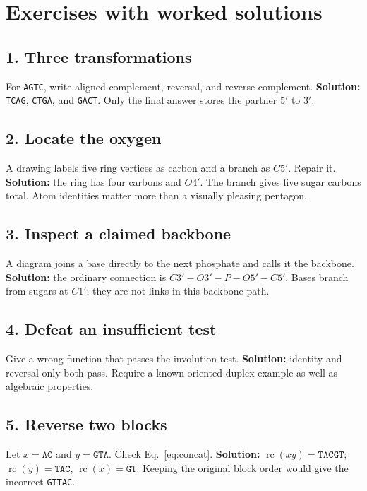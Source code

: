 \section{Exercises with worked solutions}

\subsection*{1. Three transformations}
For \texttt{AGTC}, write aligned complement, reversal, and reverse complement.
\textbf{Solution:} \texttt{TCAG}, \texttt{CTGA}, and \texttt{GACT}.
Only the final answer stores the partner $5'$ to $3'$.

\subsection*{2. Locate the oxygen}
A drawing labels five ring vertices as carbon and a branch as $C5'$.
Repair it. \textbf{Solution:} the ring has four carbons and $O4'$.
The branch gives five sugar carbons total. Atom identities matter more than
a visually pleasing pentagon.

\subsection*{3. Inspect a claimed backbone}
A diagram joins a base directly to the next phosphate and calls it the
backbone. \textbf{Solution:} the ordinary connection is
$C3'-O3'-P-O5'-C5'$. Bases branch from sugars at $C1'$; they are not
links in this backbone path.

\subsection*{4. Defeat an insufficient test}
Give a wrong function that passes the involution test.
\textbf{Solution:} identity and reversal-only both pass.
Require a known oriented duplex example as well as algebraic properties.

\subsection*{5. Reverse two blocks}
Let $x=\texttt{AC}$ and $y=\texttt{GTA}$. Check Eq.~\ref{eq:concat}.
\textbf{Solution:} $\operatorname{rc}(xy)=\texttt{TACGT}$;
$\operatorname{rc}(y)=\texttt{TAC}$, $\operatorname{rc}(x)=\texttt{GT}$.
Keeping the original block order would give the incorrect \texttt{GTTAC}.

